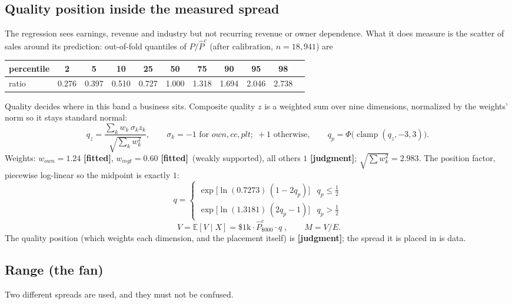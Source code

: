 \documentclass[11pt]{article}
\DeclareMathOperator{\clamp}{clamp}
\newcommand{\EV}[1]{\mathbb{E}\!\left[#1\right]}
\newcommand{\fit}{\textbf{[fitted]}}
\newcommand{\jud}{\textbf{[judgment]}}
\begin{document}
\subsection{Quality position inside the measured spread}
The regression sees earnings, revenue and industry but not recurring revenue or owner dependence. What it does measure is the scatter of sales around its prediction: out-of-fold quantiles of $P/\hat P^c$ (after calibration, $n=18{,}941$) are
\begin{center}\small
\begin{tabular}{lcccccccccc}\toprule
percentile & 2 & 5 & 10 & 25 & 50 & 75 & 90 & 95 & 98\\\midrule
ratio & 0.276 & 0.397 & 0.510 & 0.727 & 1.000 & 1.318 & 1.694 & 2.046 & 2.738\\\bottomrule
\end{tabular}\end{center}
Quality decides where in this band a business sits. Composite quality $z$ is a weighted sum over nine dimensions, normalized by the weights' norm so it stays standard normal:
\begin{equation}
q_z=\frac{\sum_k w_k\,\sigma_k z_k}{\sqrt{\sum_k w_k^2}},\qquad \sigma_k=-1\text{ for }own,cc,plt;\;+1\text{ otherwise},\qquad q_p=\Phi\big(\clamp(q_z,-3,3)\big).
\end{equation}
Weights: $w_{own}=1.24$ \fit, $w_{mgt}=0.60$ \fit\ (weakly supported), all others $1$ \jud; $\sqrt{\sum w_k^2}=2.983$. The position factor, piecewise log-linear so the midpoint is exactly $1$:
\begin{equation}
q=\begin{cases}\exp\!\big[\ln(0.7273)\,(1-2q_p)\big] & q_p\le\tfrac12\\ \exp\!\big[\ln(1.3181)\,(2q_p-1)\big] & q_p>\tfrac12\end{cases}
\end{equation}
\begin{equation}
\boxed{\;V=\EV{V\mid X}=\$1\text{k}\cdot\hat P^{c}_{\$000}\cdot q\;},\qquad M=V/E.
\end{equation}
The quality position (which weights each dimension, and the placement itself) is \jud; the spread it is placed in is data.

\subsection{Range (the fan)}
Two different spreads are used, and they must not be confused.
\end{document}
